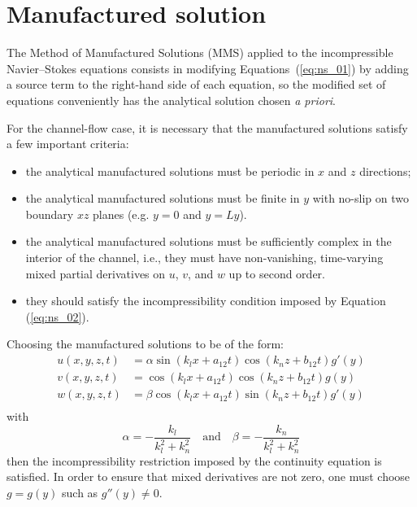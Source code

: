 \documentclass[10pt]{article}
\begin{document}
\section{Manufactured solution}

The Method of Manufactured Solutions (MMS) applied to the incompressible Navier--Stokes equations consists in modifying Equations~(\ref{eq:ns_01}) by adding a source term to the right-hand side of each equation, so the modified set of equations conveniently has the analytical solution chosen \textit{a priori}.

For the channel-flow case, it is necessary that the manufactured solutions satisfy a few important criteria:
\begin{itemize}
\item the analytical manufactured solutions must be periodic in $x$ and $z$ directions;
\item the analytical manufactured solutions must be finite in $y$ with no-slip on two boundary $xz$ planes (e.g. $y=0$ and $y=Ly$).
\item the analytical manufactured solutions must be sufficiently complex in the interior of the channel, i.e., they must have non-vanishing, time-varying mixed partial derivatives on $u$, $v$, and $w$ up to second order.
\item they should satisfy the incompressibility condition imposed by Equation (\ref{eq:ns_02}).
\end{itemize}



Choosing the manufactured solutions to be of the form:
\begin{equation}
\begin{split}\label{eq:uvw01}
u(x,y,z,t)&= \alpha \sin\left( k_l x + a_{12}t \right) \cos\left( k_n z + b_{12}t \right) g'(y)\\
v(x,y,z,t)&=        \cos\left( k_l x + a_{12}t \right) \cos\left( k_n z + b_{12}t \right) g(y)\\ 
w(x,y,z,t)&=  \beta \cos\left( k_l x + a_{12}t \right) \sin\left( k_n z + b_{12}t \right) g'(y)\\
\end{split}
\end{equation}
with
\begin{equation}\label{eq:ab01}
\alpha = -\dfrac{k_l}{k_l^2+ k_n^2}\quad\mbox{and}\quad \beta = -\dfrac{k_n}{k_l^2+ k_n^2} 
\end{equation}
then the incompressibility restriction imposed by the continuity equation is satisfied. In order to ensure that mixed derivatives are not zero, one must choose $g=g(y)$ such as $g''(y) \neq 0$.
\end{document}
